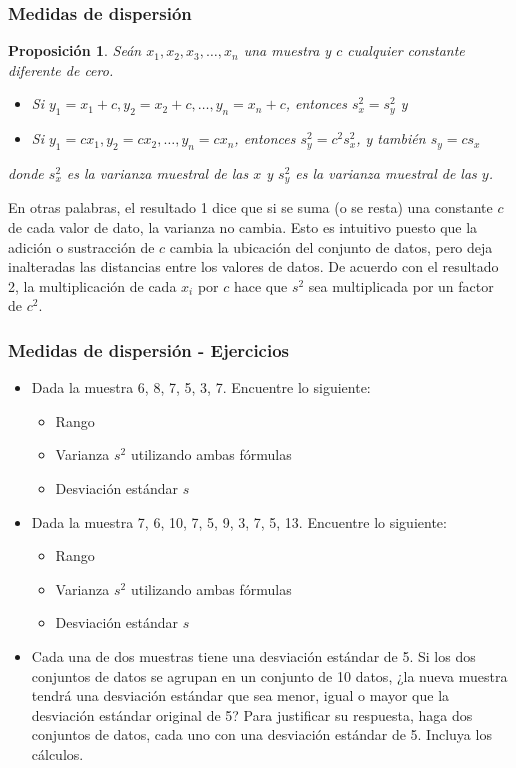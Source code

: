 \documentclass[10pt]{beamer}
\theoremstyle{plain} %
\newtheorem{prop}{Proposición}
\theoremstyle{definition}
\theoremstyle{remark}
\begin{document}
\begin{frame}
\frametitle{Medidas de dispersión}
\begin{prop}
Seán $x_1,x_2,x_3,\ldots,x_n$ una muestra y $c$ cualquier constante diferente de cero.
\begin{itemize}
\item[\textbf{1.}]Si $y_1=x_1+c, y_2=x_2+c, \ldots, y_n=x_n+c$, entonces $s_x^2=s_y^2$ y
\item[\textbf{2.}]Si $y_1=cx_1, y_2=cx_2, \ldots, y_n=cx_n$, entonces $s_y^2=c^2s_x^2$, y también $s_y=cs_x$ 
\end{itemize} 
donde $s_x^2$ es la varianza muestral de las $x$ y $s_y^2$ es la varianza muestral de las $y$.
\end{prop}
En otras palabras, el resultado 1 dice que si se suma (o se resta) una constante $c$ de cada valor de dato, la varianza no cambia. Esto es intuitivo puesto que la adición o sustracción de $c$ cambia la ubicación del conjunto de datos, pero deja inalteradas las distancias entre los valores de datos. De acuerdo con el resultado 2, la multiplicación de cada $x_i$ por $c$ hace que $s^2$ sea multiplicada por un factor de $c^2$.
\end{frame}

\begin{frame}
\frametitle{Medidas de dispersión - Ejercicios}
\begin{itemize}
\item[1.]Dada la muestra 6, 8, 7, 5, 3, 7. Encuentre lo siguiente:
\begin{itemize}
\item[a.]Rango
\item[b.]Varianza $s^2$ utilizando ambas fórmulas
\item[c.]Desviación estándar $s$
\end{itemize}
\item[2.]Dada la muestra 7, 6, 10, 7, 5, 9, 3, 7, 5, 13. Encuentre lo siguiente:
\begin{itemize}
\item[a.]Rango
\item[b.]Varianza $s^2$ utilizando ambas fórmulas
\item[c.]Desviación estándar $s$
\end{itemize}
\item[3.]Cada una de dos muestras tiene una desviación estándar de 5. Si los dos conjuntos de datos se agrupan en un conjunto de 10 datos, ¿la nueva muestra tendrá una desviación estándar que sea menor, igual o mayor que la desviación estándar original de 5? Para justificar su respuesta, haga dos conjuntos de datos, cada uno con una desviación estándar de 5. Incluya los cálculos.
\end{itemize} 
\end{frame}
\end{document}
